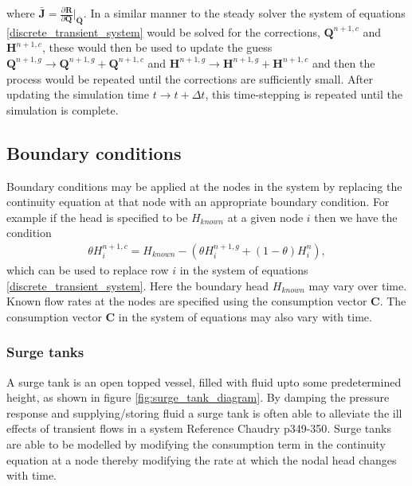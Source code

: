 \documentclass[12pt]{article}
\newcommand{\pardiv}[3]{\frac{\partial^{#1} #2}{\partial #3^{#1}}}
\begin{document}
where $\bar{\mathbf{J}} = \pardiv{}{\mathbf{R}}{\mathbf{Q}} \big\vert_{\bar{\mathbf{Q}}}$. In a similar manner to the steady solver the system of equations \eqref{discrete_transient_system} would be solved for the corrections, $\mathbf{Q}^{n+1,c}$ and $\mathbf{H}^{n+1,c}$, these would then be used to update the guess $\mathbf{Q}^{n+1,g} \rightarrow \mathbf{Q}^{n+1,g} + \mathbf{Q}^{n+1,c} $ and $\mathbf{H}^{n+1,g} \rightarrow \mathbf{H}^{n+1,g} + \mathbf{H}^{n+1,c} $ and then the process would be repeated until the corrections are sufficiently small. After updating the simulation time $t \rightarrow t + \Delta t$, this time-stepping is repeated until the simulation is complete.   

\subsection{Boundary conditions}

Boundary conditions may be applied at the nodes in the system by replacing the continuity equation at that node with an appropriate boundary condition. For example if the head is specified to be $H_{known}$ at a given node $i$ then we have the condition 
\begin{align}
\theta H_i^{n+1,c} = H_{known} - \left( \theta H_i^{n+1,g} + (1-\theta)H_i^n \right),
\end{align} 
which can be used to replace row $i$ in the system of equations \eqref{discrete_transient_system}. Here the boundary head $H_{known}$ may vary over time. Known flow rates at the nodes are specified using the consumption vector $\mathbf{C}$. The consumption vector $\mathbf{C}$ in the system of equations may also vary with time. 

\subsubsection{Surge tanks}

A surge tank is an open topped vessel, filled with fluid upto some predetermined height, as shown in figure \ref{fig:surge_tank_diagram}. By damping the pressure response and supplying/storing fluid a surge tank is often able to alleviate the ill effects of transient flows in a system {\color{red} Reference Chaudry p349-350}. Surge tanks are able to be modelled by modifying the consumption term in the continuity equation at a node thereby modifying the rate at which the nodal head changes with time. 
\end{document}
